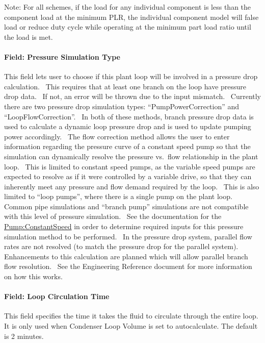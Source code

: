 Note: For all schemes, if the load for any individual component is less than the component load at the minimum PLR, the individual component model will false load or reduce duty cycle while operating at the minimum part load ratio until the load is met.

\paragraph{Field: Pressure Simulation Type}\label{field-pressure-simulation-type-1}

This field lets user to choose if this plant loop will be involved in a pressure drop calculation.~ This requires that at least one branch on the loop have pressure drop data.~ If not, an error will be thrown due to the input mismatch.~ Currently there are two pressure drop simulation types: ``PumpPowerCorrection'' and ``LoopFlowCorrection''.~ In both of these methods, branch pressure drop data is used to calculate a dynamic loop pressure drop and is used to update pumping power accordingly.~ The flow correction method allows the user to enter information regarding the pressure curve of a constant speed pump so that the simulation can dynamically resolve the pressure vs.~flow relationship in the plant loop.~ This is limited to constant speed pumps, as the variable speed pumps are expected to resolve as if it were controlled by a variable drive, so that they can inherently meet any pressure and flow demand required by the loop.~ This is also limited to ``loop pumps'', where there is a single pump on the plant loop.~ Common pipe simulations and ``branch pump'' simulations are not compatible with this level of pressure simulation.~ See the documentation for the \hyperref[pumpconstantspeed]{Pump:ConstantSpeed} in order to determine required inputs for this pressure simulation method to be performed.~ In the pressure drop system, parallel flow rates are not resolved (to match the pressure drop for the parallel system).~ Enhancements to this calculation are planned which will allow parallel branch flow resolution.~ See the Engineering Reference document for more information on how this works.

\paragraph{Field: Loop Circulation Time}\label{condenserloop-field-loop-circulation-time}

This field specifies the time it takes the fluid to circulate through the entire loop. It is only used when Condenser Loop Volume is set to autocalculate. The default is 2 minutes.

